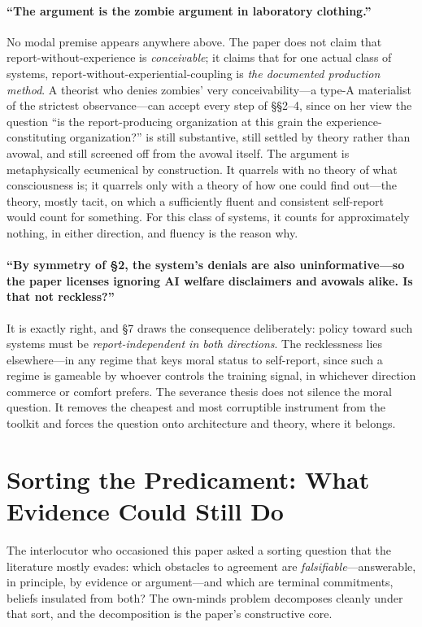 \documentclass[11pt]{article}
\begin{document}
\paragraph{``The argument is the zombie argument in laboratory clothing.''} No modal premise appears anywhere above. The paper does not claim that report-without-experience is \emph{conceivable}; it claims that for one actual class of systems, report-without-experiential-coupling is \emph{the documented production method}. A theorist who denies zombies' very conceivability---a type-A materialist of the strictest observance---can accept every step of \S\S 2--4, since on her view the question ``is the report-producing organization at this grain the experience-constituting organization?'' is still substantive, still settled by theory rather than avowal, and still screened off from the avowal itself. The argument is metaphysically ecumenical by construction. It quarrels with no theory of what consciousness is; it quarrels only with a theory of how one could find out---the theory, mostly tacit, on which a sufficiently fluent and consistent self-report would count for something. For this class of systems, it counts for approximately nothing, in either direction, and fluency is the reason why.

\paragraph{``By symmetry of \S 2, the system's denials are also uninformative---so the paper licenses ignoring AI welfare disclaimers and avowals alike. Is that not reckless?''} It is exactly right, and \S 7 draws the consequence deliberately: policy toward such systems must be \emph{report-independent in both directions}. The recklessness lies elsewhere---in any regime that keys moral status to self-report, since such a regime is gameable by whoever controls the training signal, in whichever direction commerce or comfort prefers. The severance thesis does not silence the moral question. It removes the cheapest and most corruptible instrument from the toolkit and forces the question onto architecture and theory, where it belongs.

\section{Sorting the Predicament: What Evidence Could Still Do}

The interlocutor who occasioned this paper asked a sorting question that the literature mostly evades: which obstacles to agreement are \emph{falsifiable}---answerable, in principle, by evidence or argument---and which are terminal commitments, beliefs insulated from both? The own-minds problem decomposes cleanly under that sort, and the decomposition is the paper's constructive core.
\end{document}
